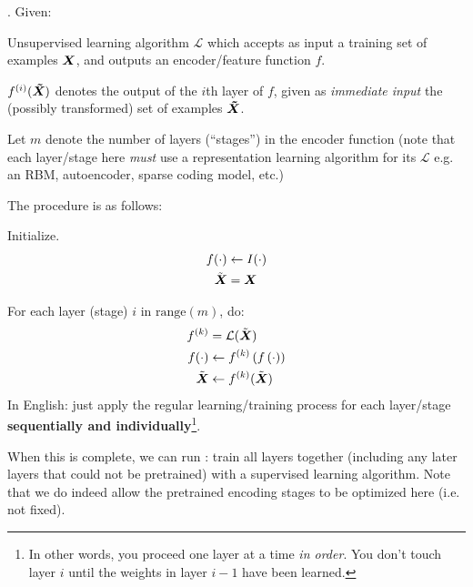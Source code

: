 \documentclass[11pt]{article}
\begin{document}
\myspace
\p {}. Given:
\begin{compactitem}[-]
	\item Unsupervised learning algorithm $\mathcal{L}$ which accepts as input a training set of examples $\bm{X}_{}$, and outputs an encoder/feature function $f$. 
	\item $f^{(i)}(\bm{\tilde{X}}_{})$ denotes the output of the $i$th layer of $f$, given as \textit{immediate input} the (possibly transformed) set of examples $\bm{\tilde{X}}_{}$.
	\item Let $m$ denote the number of layers (``stages'') in the encoder function (note that each layer/stage here \textit{must} use a representation learning algorithm for its $\mathcal{L}$ e.g. an RBM, autoencoder, sparse coding model, etc.)
\end{compactitem}
The procedure is as follows:
\begin{compactenum}
	\item Initialize.
	\begin{align}
		f(\cdot) &\leftarrow I(\cdot) \\
		\tilde{\bm{X}_{}} &= \bm{X}_{}
	\end{align}
	
	\item For each layer (stage) $i$ in $\text{range}(m)$, do:
	\begin{align}
		f^{(k)} &= \mathcal{L}(\tilde{\bm{X}_{}}) \\
		f(\cdot) &\leftarrow  f^{(k)}\left(f\left(\cdot\right)\right) \\
		\tilde{\bm{X}_{}} &\leftarrow f^{(k)}(\tilde{\bm{X}_{}})
	\end{align}
	In English: just apply the regular learning/training process for each layer/stage \textbf{sequentially and individually}\footnote{In other words, you proceed one layer at a time \textit{in order}. You don't touch layer $i$ until the weights in layer $i - 1$ have been learned.}.
\end{compactenum}
When this is complete, we can run : train all layers together (including any later layers that could not be pretrained) with a supervised learning algorithm. Note that we do indeed allow the pretrained encoding stages to be optimized here (i.e. not fixed).

% 
% 
\end{document}

